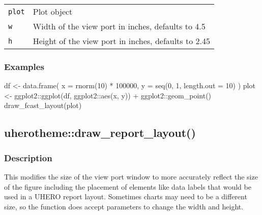 \documentclass[
  letterpaper,
  DIV=11,
  numbers=noendperiod]{scrreport}
\newenvironment{Shaded}{\begin{snugshade}}{\end{snugshade}}
\newcommand{\AttributeTok}[1]{\textcolor[rgb]{0.40,0.45,0.13}{#1}}
\newcommand{\DecValTok}[1]{\textcolor[rgb]{0.68,0.00,0.00}{#1}}
\newcommand{\FunctionTok}[1]{\textcolor[rgb]{0.28,0.35,0.67}{#1}}
\newcommand{\NormalTok}[1]{\textcolor[rgb]{0.00,0.23,0.31}{#1}}
\newcommand{\OtherTok}[1]{\textcolor[rgb]{0.00,0.23,0.31}{#1}}
\newcommand{\SpecialCharTok}[1]{\textcolor[rgb]{0.37,0.37,0.37}{#1}}
\begin{document}
\begin{longtable}[]{@{}ll@{}}
\toprule\noalign{}
\endhead
\bottomrule\noalign{}
\endlastfoot
\texttt{plot} & Plot object \\
\texttt{w} & Width of the view port in inches, defaults to 4.5 \\
\texttt{h} & Height of the view port in inches, defaults to 2.45 \\
\end{longtable}

\subsubsection{Examples}\label{examples-76}

\begin{Shaded}
\begin{Highlighting}[]
\NormalTok{df }\OtherTok{\textless{}{-}} \FunctionTok{data.frame}\NormalTok{(}
  \AttributeTok{x =} \FunctionTok{rnorm}\NormalTok{(}\DecValTok{10}\NormalTok{) }\SpecialCharTok{*} \DecValTok{100000}\NormalTok{,}
  \AttributeTok{y =} \FunctionTok{seq}\NormalTok{(}\DecValTok{0}\NormalTok{, }\DecValTok{1}\NormalTok{, }\AttributeTok{length.out =} \DecValTok{10}\NormalTok{)}
\NormalTok{)}
\NormalTok{plot }\OtherTok{\textless{}{-}}\NormalTok{ ggplot2}\SpecialCharTok{::}\FunctionTok{ggplot}\NormalTok{(df, ggplot2}\SpecialCharTok{::}\FunctionTok{aes}\NormalTok{(x, y)) }\SpecialCharTok{+}\NormalTok{ ggplot2}\SpecialCharTok{::}\FunctionTok{geom\_point}\NormalTok{()}
\FunctionTok{draw\_fcast\_layout}\NormalTok{(plot)}
\end{Highlighting}
\end{Shaded}

\subsection{uherotheme::draw\_report\_layout()}\label{uherothemedraw_report_layout}

\subsubsection{Description}\label{description-78}

This modifies the size of the view port window to more accurately
reflect the size of the figure including the placement of elements like
data labels that would be used in a UHERO report layout. Sometimes
charts may need to be a different size, so the function does accept
parameters to change the width and height.
\end{document}
